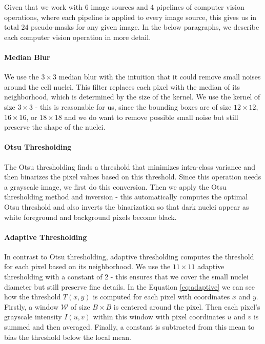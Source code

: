 Given that we work with 6 image sources and 4 pipelines of computer vision operations, where each pipeline is applied to every image source, this gives us in total 24 pseudo-masks for any given image. In the below paragraphs, we describe each computer vision operation in more detail.

\paragraph{Median Blur}
We use the $3\times3$ median blur with the intuition that it could remove small noises around the cell nuclei. This filter replaces each pixel with the median of its neighborhood, which is determined by the size of the kernel. We use the kernel of size $3\times3$ - this is reasonable for us, since the bounding boxes are of size $12\times12$, $16\times16$, or $18\times18$ and we do want to remove possible small noise but still preserve the shape of the nuclei.

\paragraph{Otsu Thresholding}
The Otsu thresholding finds a threshold that minimizes intra-class variance and then binarizes the pixel values based on this threshold. Since this operation needs a grayscale image, we first do this conversion. Then we apply the Otsu thresholding method and inversion - this automatically computes the optimal Otsu threshold and also inverts the binarization so that dark nuclei appear as white foreground and background pixels become black.

\paragraph{Adaptive Thresholding}
In contrast to Otsu thresholding, adaptive thresholding computes the threshold for each pixel based on its neighborhood. We use the $11\times11$ adaptive thresholding with a constant of 2 - this ensures that we cover the small nuclei diameter but still preserve fine details. In the Equation \ref{eq:adaptive} we can see how the threshold $T(x,y)$ is computed for each pixel with coordinates $x$ and $y$. Firstly, a window $\mathcal{W}$ of size $B\times B$ is centered around the pixel. Then each pixel's grayscale intensity $I(u,v)$ within this window with pixel coordinates $u$ and $v$ is summed and then averaged. Finally, a constant is subtracted from this mean to bias the threshold below the local mean.

